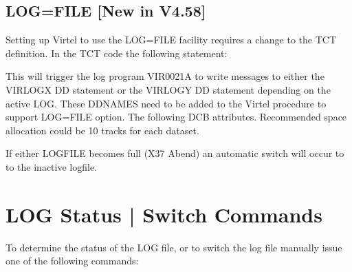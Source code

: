 \documentclass[letterpaper,10pt,english]{sphinxmanual}
\begin{document}
\subsection{LOG=FILE {[}New in V4.58{]}}
\label{\detokenize{audit_operations_ and_performance:log-file-new-in-v4-58}}
\sphinxAtStartPar
Setting up Virtel to use the LOG=FILE facility requires a change to the TCT definition. In the TCT code the following statement:\sphinxhyphen{}

\begin{sphinxVerbatim}[commandchars=\\\{\}]
\end{sphinxVerbatim}

\sphinxAtStartPar
This will trigger the log program VIR0021A to write messages to either the VIRLOGX DD statement or the VIRLOGY DD statement depending on the active LOG. These DDNAMES need to be added to the Virtel procedure to support LOG=FILE option. The following DCB attributes. Recommended space allocation could be 10 tracks for each dataset.

\begin{sphinxVerbatim}[commandchars=\\\{\}]
  
      
\end{sphinxVerbatim}

\sphinxAtStartPar
If either LOGFILE becomes full (X37 Abend) an automatic switch will occur to to the inactive logfile.

\ignorespaces 
{}\ignorespaces 

\section{LOG Status | Switch Commands}
\label{\detokenize{audit_operations_ and_performance:log-status-switch-commands}}\label{\detokenize{audit_operations_ and_performance:index-10}}
\sphinxAtStartPar
To determine the status of the LOG file, or to switch the log file manually issue one of the following commands:\sphinxhyphen{}
\end{document}
